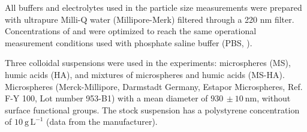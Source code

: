 \documentclass[journal=langd5,manuscript=article]{achemso}
\begin{document}



All buffers and electrolytes used in the particle size measurements were prepared with ultrapure Milli-Q water (Millipore-Merk)  filtered through a 220 nm filter. Concentrations of  and  were optimized to reach the same operational measurement conditions used with phosphate saline buffer (PBS, ).


Three colloidal suspensions were used in the experiments: microspheres (MS), humic acids (HA), and mixtures of microspheres and humic acids (MS-HA).
Microspheres (Merck-Millipore, Darmstadt Germany, Estapor Microspheres, Ref. F-Y 100, Lot number 953-B1) with a mean diameter of $930 \, \pm 10~\mathrm{nm}$, without surface functional groups. The stock suspension has a polystyrene concentration of $10~\mathrm{g\,L^{-1}}$ (data from the manufacturer).
\end{document}
